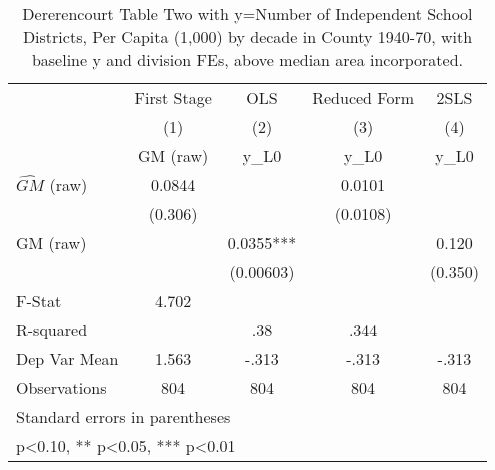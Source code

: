 \begin{table}[htbp]\centering
\def\sym#1{\ifmmode^{#1}\else\(^{#1}\)\fi}
\caption{Dererencourt Table Two with y=Number of Independent School Districts, Per Capita (1,000) by decade in County 1940-70, with baseline y and division FEs, above median area incorporated.}
\begin{tabular}{l*{4}{c}}
\toprule
                    & First Stage   &         OLS   &Reduced Form   &        2SLS   \\
                    &\multicolumn{1}{c}{(1)}&\multicolumn{1}{c}{(2)}&\multicolumn{1}{c}{(3)}&\multicolumn{1}{c}{(4)}\\
                    &\multicolumn{1}{c}{GM  (raw)}&\multicolumn{1}{c}{y\_L0}&\multicolumn{1}{c}{y\_L0}&\multicolumn{1}{c}{y\_L0}\\
\midrule
$\hat{GM}$ (raw)    &      0.0844   &               &      0.0101   &               \\
                    &     (0.306)   &               &    (0.0108)   &               \\
\addlinespace
GM  (raw)           &               &      0.0355***&               &       0.120   \\
                    &               &   (0.00603)   &               &     (0.350)   \\
\midrule
F-Stat              &       4.702   &               &               &               \\
R-squared           &               &         .38   &        .344   &               \\
Dep Var Mean        &       1.563   &       -.313   &       -.313   &       -.313   \\
Observations        &         804   &         804   &         804   &         804   \\
\bottomrule
\multicolumn{5}{l}{\footnotesize Standard errors in parentheses}\\
\multicolumn{5}{l}{\footnotesize * p<0.10, ** p<0.05, *** p<0.01}\\
\end{tabular}
\end{table}
